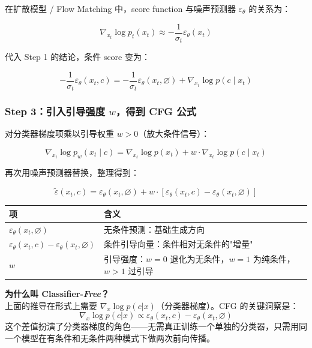 在扩散模型 / Flow Matching 中，score function 与噪声预测器 $\varepsilon_\theta$ 的关系为：

\[
\nabla_{x_t} \log p_t(x_t) \approx -\frac{1}{\sigma_t} \varepsilon_\theta(x_t)
\]

代入 Step 1 的结论，条件 score 变为：

\[
-\frac{1}{\sigma_t} \varepsilon_\theta(x_t, c) = -\frac{1}{\sigma_t} \varepsilon_\theta(x_t, \varnothing) + \nabla_{x_t} \log p(c \mid x_t)
\]

\subsubsection{Step 3：引入引导强度 $w$，得到 CFG 公式}

对分类器梯度项乘以引导权重 $w > 0$（放大条件信号）：

\[
\nabla_{x_t} \log p_w(x_t \mid c) = \nabla_{x_t} \log p(x_t) + w \cdot \nabla_{x_t} \log p(c \mid x_t)
\]

再次用噪声预测器替换，整理得到：

\[
\boxed{\tilde{\varepsilon}(x_t, c) = \varepsilon_\theta(x_t, \varnothing) + w \cdot \left[\varepsilon_\theta(x_t, c) - \varepsilon_\theta(x_t, \varnothing)\right]}
\]

\begin{center}
{\small
\begin{tabular}{p{5cm}p{8.5cm}}
\hline
\textbf{项} & \textbf{含义} \\
\hline
$\varepsilon_\theta(x_t, \varnothing)$ & 无条件预测：基础生成方向 \\
$\varepsilon_\theta(x_t, c) - \varepsilon_\theta(x_t, \varnothing)$ & 条件引导向量：条件相对无条件的"增量" \\
$w$ & 引导强度：$w=0$ 退化为无条件，$w=1$ 为纯条件，$w>1$ 过引导 \\
\hline
\end{tabular}
}
\end{center}

\begin{warnbox}
\textbf{为什么叫 Classifier-\textit{Free}？}\\
上面的推导在形式上需要 $\nabla_x \log p(c|x)$（分类器梯度）。CFG 的关键洞察是：
\[
\nabla_x \log p(c|x) \propto \varepsilon_\theta(x_t, c) - \varepsilon_\theta(x_t, \varnothing)
\]
这个差值扮演了分类器梯度的角色——无需真正训练一个单独的分类器，只需用同一个模型在有条件和无条件两种模式下做两次前向传播。
\end{warnbox}

